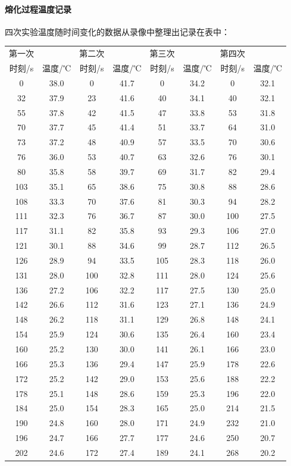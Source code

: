 \documentclass{article} %
\begin{document}
\paragraph{熔化过程温度记录}
四次实验温度随时间变化的数据从录像中整理出记录在表中：\\
\begin{tabular*}{0.96\textwidth}{@{\extracolsep{\fill}}c c|c c|c c|c c}
\hline
第一次&&第二次&&第三次&&第四次&\\
时刻/s&温度/℃&时刻/s&温度/℃&时刻/s&温度/℃&时刻/s&温度/℃\\
\hline
0&38.0 &0&41.7 &0&34.2 &0&32.1 \\
32&37.9 &23&41.6 &40&34.1 &40&32.1 \\
55&37.8 &42&41.5 &47&33.8 &53&31.8 \\
70&37.7 &45&41.4 &51&33.7 &64&31.0 \\
73&37.2 &48&40.9 &57&33.5 &70&30.6 \\
76&36.0 &53&40.7 &63&32.6 &76&30.1 \\
80&35.8 &58&39.7 &69&31.7 &82&29.4 \\
103&35.1 &65&38.6 &75&30.8 &88&28.6 \\
108&33.3 &70&37.6 &81&30.3 &94&28.2 \\
111&32.3 &76&36.7 &87&30.0 &100&27.5 \\
117&31.1 &82&35.8 &93&29.3 &106&27.0 \\
121&30.1 &88&34.6 &99&28.7 &112&26.5 \\
126&28.9 &94&33.5 &105&28.3 &118&26.0 \\
131&28.0 &100&32.8 &111&28.0 &124&25.6 \\
136&27.2 &106&32.2 &117&27.5 &130&25.0 \\
142&26.6 &112&31.6 &123&27.1 &136&24.9 \\
148&26.2 &118&31.1 &129&26.8 &148&24.1 \\
154&25.9 &124&30.6 &135&26.4 &160&23.4 \\
160&25.2 &130&30.0 &141&26.1 &166&23.0 \\
166&25.3 &136&29.4 &147&25.9 &178&22.6 \\
172&25.2 &142&29.0 &153&25.6 &188&22.2 \\
178&25.1 &148&28.6 &159&25.3 &196&22.0 \\
184&25.0 &154&28.3 &165&25.0 &214&21.5 \\
190&24.8 &160&28.0 &171&24.9 &232&21.0 \\
196&24.7 &166&27.7 &177&24.6 &250&20.7 \\
202&24.6 &172&27.4 &189&24.1 &268&20.2 \\

\end{tabular*}
\end{document}
